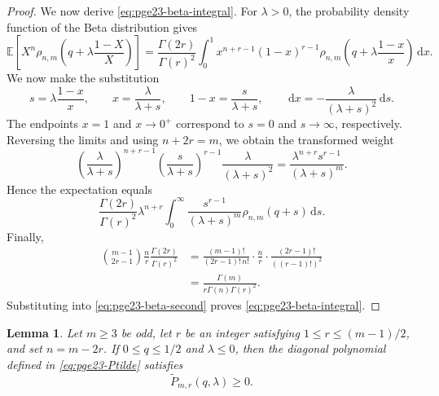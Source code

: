 \documentclass[11pt]{article}
\newtheorem{lemma}[theorem]{Lemma}
\theoremstyle{remark}
\numberwithin{equation}{section}
\newcommand{\dd}{\,\mathrm d}
\newcommand{\E}{\mathbb E}
\begin{document}
\begin{proof}
  We now derive \eqref{eq:pge23-beta-integral}.
  For $\lambda>0$, the probability density function of the Beta distribution gives
  \[
    \E\left[X^n\rho_{n,m}\left(q+\lambda\frac{1-X}{X}\right)\right]
    =\frac{\Gamma(2r)}{\Gamma(r)^2}
    \int_0^1 x^{n+r-1}(1-x)^{r-1}
    \rho_{n,m}\left(q+\lambda\frac{1-x}{x}\right)\dd x.
  \]
  We now make the substitution
  \[
    s=\lambda\frac{1-x}{x},
    \qquad
    x=\frac{\lambda}{\lambda+s},
    \qquad
    1-x=\frac{s}{\lambda+s},
    \qquad
    \dd x=-\frac{\lambda}{(\lambda+s)^2}\dd s.
  \]
  The endpoints $x=1$ and $x\to0^+$ correspond to $s=0$ and
  $s\to\infty$, respectively. Reversing the limits and using $n+2r=m$,
  we obtain the transformed weight
  \[
    \left(\frac{\lambda}{\lambda+s}\right)^{n+r-1}
    \left(\frac{s}{\lambda+s}\right)^{r-1}
    \frac{\lambda}{(\lambda+s)^2}
    =\frac{\lambda^{n+r}s^{r-1}}{(\lambda+s)^m}.
  \]
  Hence the expectation equals
  \[
    \frac{\Gamma(2r)}{\Gamma(r)^2}\lambda^{n+r}
    \int_0^\infty
    \frac{s^{r-1}}{(\lambda+s)^m}\rho_{n,m}(q+s)\dd s.
  \]
  Finally,
  \[
    \begin{aligned}
      \binom{m-1}{2r-1}\frac {n}{r}
      \frac{\Gamma(2r)}{\Gamma(r)^2}
      &=\frac{(m-1)!}{(2r-1)!\,n!}\cdot\frac {n}{r}
        \cdot\frac{(2r-1)!}{((r-1)!)^2}\\
      &=\frac{\Gamma(m)}{r\Gamma(n)\Gamma(r)^2}.
    \end{aligned}
  \]
  Substituting into \eqref{eq:pge23-beta-second} proves
  \eqref{eq:pge23-beta-integral}.
\end{proof}

\begin{lemma}\label{lem:pge23-ell-negative}
  Let $m\ge3$ be odd, let $r$ be an integer satisfying
  $1\le r\le(m-1)/2$, and set $n=m-2r$.
  If $0\le q\le1/2$ and $\lambda\le0$, then the diagonal polynomial
  defined in \eqref{eq:pge23-Ptilde} satisfies
  \[
    \widetilde P_{m,r}(q,\lambda)\ge0.
  \]
\end{lemma}
\end{document}
